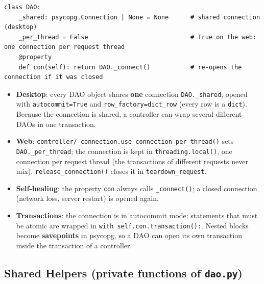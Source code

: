 \begin{lstlisting}[numbers=none]
class DAO:
    _shared: psycopg.Connection | None = None      # shared connection (desktop)
    _per_thread = False                            # True on the web: one connection per request thread
    @property
    def con(self): return DAO._connect()           # re-opens the connection if it was closed
\end{lstlisting}

\begin{itemize}
\tightlist
\item
  \textbf{Desktop}: every DAO object shares \textbf{one} connection
  \texttt{DAO.\allowbreak{}\_\allowbreak{}shared}, opened with \texttt{autocommit=\allowbreak{}True} and
  \texttt{row\_\allowbreak{}factory=\allowbreak{}dict\_\allowbreak{}row} (every row is a \texttt{dict}).
  Because the connection is shared, a controller can wrap several
  different DAOs in one transaction.
\item
  \textbf{Web}:
  \texttt{controller/\allowbreak{}\_\allowbreak{}connection.\allowbreak{}use\_\allowbreak{}connection\_\allowbreak{}per\_\allowbreak{}thread(\allowbreak{})} sets
  \texttt{DAO.\allowbreak{}\_\allowbreak{}per\_\allowbreak{}thread}; the connection is kept in
  \texttt{threading.\allowbreak{}local(\allowbreak{})}, one connection per request thread (the
  transactions of different requests never mix).
  \texttt{release\_\allowbreak{}connection(\allowbreak{})} closes it in
  \texttt{teardown\_\allowbreak{}request}.
\item
  \textbf{Self-healing}: the property \texttt{con} always calls
  \texttt{\_\allowbreak{}connect(\allowbreak{})}; a closed connection (network loss, server
  restart) is opened again.
\item
  \textbf{Transactions}: the connection is in autocommit mode;
  statements that must be atomic are wrapped in
  \texttt{with self.\allowbreak{}con.\allowbreak{}transaction(\allowbreak{}):}. Nested blocks become
  \textbf{savepoints} in psycopg, so a DAO can open its own transaction
  inside the transaction of a controller.
\end{itemize}

\hypertarget{shared-helpers-private-functions-of-dao.py}{%
\subsection{\texorpdfstring{Shared Helpers (private functions of
\texttt{dao.\allowbreak{}py})}{Shared Helpers (private functions of dao.py)}}\label{shared-helpers-private-functions-of-dao.py}}

